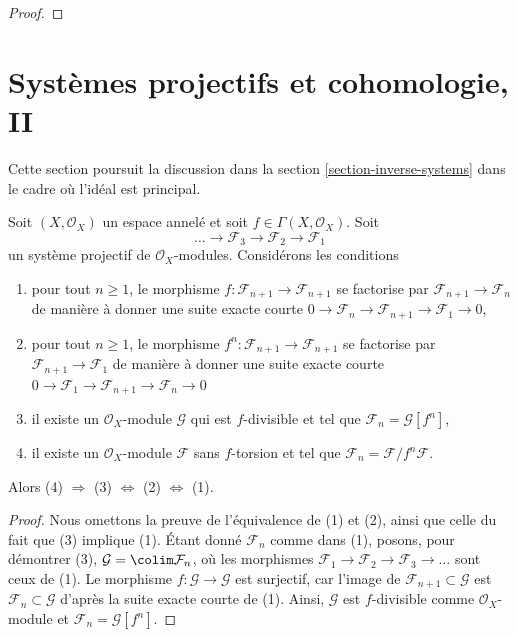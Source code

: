 {\begin{proof}
\end{proof}





\section{Systèmes projectifs et cohomologie, II}

\label{section-inverse-systems-bis}

\noindent
Cette section poursuit la discussion dans la section \ref{section-inverse-systems} dans le cadre où l'idéal est principal.

\begin{lemma}

\label{lemma-equivalent-f-good}

Soit $(X, \mathcal{O}_X)$ un espace annelé et soit $f \in \Gamma(X, \mathcal{O}_X)$. Soit
$$
\ldots \to \mathcal{F}_3 \to \mathcal{F}_2 \to \mathcal{F}_1
$$
un système projectif de $\mathcal{O}_X$-modules. Considérons les conditions

\begin{enumerate}

\item pour tout $n \geq 1$, le morphisme
$f : \mathcal{F}_{n + 1} \to \mathcal{F}_{n + 1}$ se factorise par $\mathcal{F}_{n + 1} \to \mathcal{F}_n$ de manière à donner une suite exacte courte
$0 \to \mathcal{F}_n \to \mathcal{F}_{n + 1} \to \mathcal{F}_1 \to 0$,
\item pour tout $n \geq 1$, le morphisme
$f^n : \mathcal{F}_{n + 1} \to \mathcal{F}_{n + 1}$
se factorise par $\mathcal{F}_{n + 1} \to \mathcal{F}_1$
de manière à donner une suite exacte courte
$0 \to \mathcal{F}_1 \to \mathcal{F}_{n + 1} \to \mathcal{F}_n \to 0$

\item il existe un $\mathcal{O}_X$-module $\mathcal{G}$
qui est $f$-divisible et tel que $\mathcal{F}_n = \mathcal{G}[f^n]$,
\item il existe un $\mathcal{O}_X$-module $\mathcal{F}$
sans $f$-torsion et tel que
$\mathcal{F}_n = \mathcal{F}/f^n\mathcal{F}$.

\end{enumerate}

Alors (4) $\Rightarrow$ (3) $\Leftrightarrow$ (2) $\Leftrightarrow$ (1).

\end{lemma}

\begin{proof}
Nous omettons la preuve de l'équivalence de (1) et (2), ainsi que celle du fait que (3) implique (1). Étant donné $\mathcal{F}_n$ comme dans (1), posons, pour démontrer (3),
$\mathcal{G} = \colim \mathcal{F}_n$, où les morphismes
$\mathcal{F}_1 \to \mathcal{F}_2 \to \mathcal{F}_3 \to \ldots$
sont ceux de (1). Le morphisme $f : \mathcal{G} \to \mathcal{G}$
est surjectif, car l'image de $\mathcal{F}_{n + 1} \subset \mathcal{G}$
est $\mathcal{F}_n \subset \mathcal{G}$ d'après la suite exacte courte de (1).
Ainsi, $\mathcal{G}$ est $f$-divisible comme $\mathcal{O}_X$-module et
$\mathcal{F}_n = \mathcal{G}[f^n]$.


\end{proof}}
